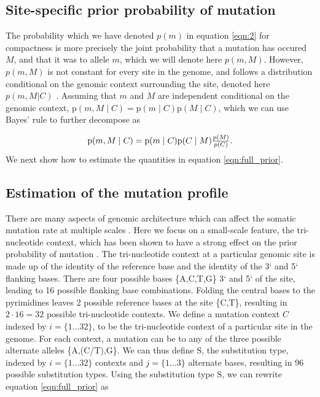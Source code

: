 \documentclass[a4,center,fleqn]{NAR}
\begin{document}
\subsection{Site-specific prior probability of mutation}
The probability which we have denoted $p(m)$ in equation \ref{eqn:2} for compactness is more precisely the joint probability that a mutation has occured $M$, and that it was to allele $m$, which we will denote here $p(m,M)$.
However, $p(m,M)$ is not constant for every site in the genome, and follows a distribution conditional on the genomic context surrounding the site, denoted here $p(m,M | C)$ \cite{Buisson2019}.
Assuming that $m$ and $M$ are independent conditional on the genomic context, $\mathrm{p}(m,M \mid C) = \mathrm{p}(m \mid C) \mathrm{p}(M \mid C)$, which we can use Bayes' rule to further decompose as 

\begin{equation}
  \label{eqn:full_prior}
  $$
  \mathrm{p}(m,M \mid C) = \mathrm{p}(m \mid C) \mathrm{p}(C \mid M)\frac{p(M)}{p(C)}.
  $$
\end{equation}
We next show how to estimate the quantities in equation \ref{eqn:full_prior}.

\subsection{Estimation of the mutation profile}
There are many aspects of genomic architecture which can affect the somatic mutation rate at multiple scales \cite{Buisson2019}.
Here we focus on a small-scale feature, the tri-nucleotide context, which has been shown to have a strong effect on the prior probability of mutation \citep{Nik-Zainal2012a,Alexandrov2015,Lee-Six2018}.
The tri-nucleotide context at a particular genomic site is made up of the identity of the reference base and the identity of the 3` and 5` flanking bases.
There are four possible bases {\{A,C,T,G\}} 3` and 5` of the site, leading to 16 possible flanking base combinations.
Folding the central bases to the pyrimidines leaves 2 possible reference bases at the site {\{C,T\}}, resulting in $2 \cdot 16 = 32$ possible tri-nucleotide contexts.
We define a mutation context $C$ indexed by $i=\{1 \dots 32\}$, to be the tri-nucleotide context of a particular site in the genome. 
For each context, a mutation can be to any of the three possible alternate alleles {\{A,(C/T),G\}}. 
We can thus define $\mathrm{S}$, the substitution type, indexed by $i=\{1 \dots 32\}$ contexts and $j = \{1 \dots 3\}$ alternate bases, resulting in 96 possible substitution types.
Using the substitution type $\mathrm{S}$, we can rewrite equation \ref{eqn:full_prior} as 
\end{document}
